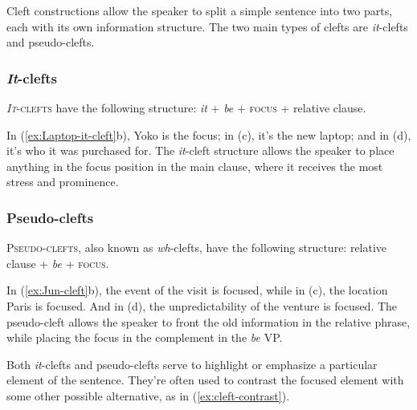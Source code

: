 Cleft constructions allow the speaker to split a simple sentence into two parts, each with its own information structure. The two main types of clefts are \textit{it}-clefts and pseudo-clefts.

\subsubsection*{\textit{It}-clefts}
\textsc{\textit{It}-clefts} have the following structure: \textit{it} + \textit{be} + \textsc{focus} + relative clause.

\ea \label{ex:Laptop-it-cleft}
    \z
\z

In (\ref{ex:Laptop-it-cleft}b), Yoko is the focus; in (c), it's the new laptop; and in (d), it's who it was purchased for. The \textit{it}-cleft structure allows the speaker to place anything in the focus position in the main clause, where it receives the most stress and prominence.

\subsubsection*{Pseudo-clefts}
\textsc{Pseudo-clefts}, also known as \textit{wh}-clefts, have the following structure: relative clause + \textit{be} + \textsc{focus}.


\ea \label{ex:Jun-cleft}
    \z
\z

In (\ref{ex:Jun-cleft}b), the event of the visit is focused, while in (c), the location Paris is focused. And in (d), the unpredictability of the venture is focused. The pseudo-cleft allows the speaker to front the old information in the relative phrase, while placing the focus in the complement in the \textit{be} VP.

Both \textit{it}-clefts and pseudo-clefts serve to highlight or emphasize a particular element of the sentence. They're often used to contrast the focused element with some other possible alternative, as in (\ref{ex:cleft-contrast}).

